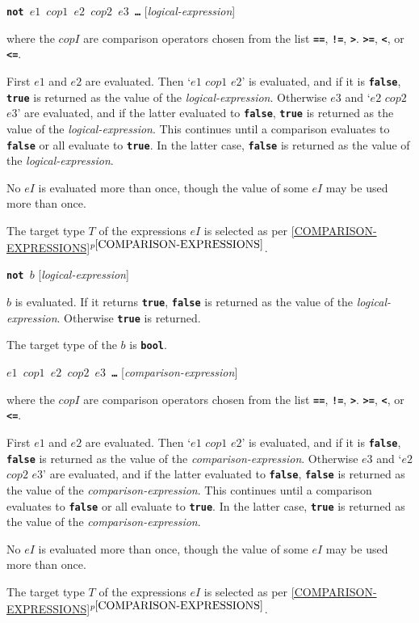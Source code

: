 \documentclass[12pt]{article}
\newcommand{\TT}[1]{{\tt \bfseries #1}}
\newcommand{\itemref}[1]{\ref{#1}$^{p\pageref{#1}}$}
\newenvironment{indpar}[1][0.3in]%
	{\begin{list}{}%
		     {\setlength{\itemsep}{0in}%
		      \setlength{\topsep}{0in}%
		      \setlength{\parsep}{1ex}%
		      \setlength{\labelwidth}{#1}%
		      \setlength{\leftmargin}{#1}%
		      \addtolength{\leftmargin}{\labelsep}}%
	 \item}%
	{\end{list}}
\begin{document}
\TT{not $e1$ $cop1$ $e2$ $cop2$ $e3$ \ldots{}}
\hfill [{\em logical-expression}]
\begin{indpar}
where the $copI$ are comparison operators chosen from the list
\TT{==}, \TT{!=}, \TT{>}. \TT{>=}, \TT{<}, or \TT{<=}.

First $e1$ and $e2$ are evaluated.  Then `$e1$ $cop1$ $e2$'
is evaluated, and if it is \TT{false},
\TT{true} is returned as the value of the {\em logical-expression}.
Otherwise $e3$ and `$e2$ $cop2$ $e3$' are evaluated, and if the latter
evaluated to \TT{false},
\TT{true} is returned as the value of the {\em logical-expression}.
This continues until a comparison evaluates to \TT{false} or all
evaluate to \TT{true}.  In the latter case, \TT{false} is returned as
the value of the {\em logical-expression}.

No $eI$ is evaluated more than once, though the value of some $eI$
may be used more than once.

The target type $T$ of the expressions $eI$ is selected as
per \itemref{COMPARISON-EXPRESSIONS}.
\end{indpar}

\TT{not $b$}
\hfill [{\em logical-expression}]
\begin{indpar}
$b$ is evaluated.  If it returns \TT{true}, \TT{false} is
returned as the value of the {\em logical-expression}.
Otherwise \TT{true} is returned.

The target type of the $b$ is \TT{bool}.
\end{indpar}

\TT{$e1$ $cop1$ $e2$ $cop2$ $e3$ \ldots{}}
\hfill [{\em comparison-expression}]
\begin{indpar}
where the $copI$ are comparison operators chosen from the list
\TT{==}, \TT{!=}, \TT{>}. \TT{>=}, \TT{<}, or \TT{<=}.

First $e1$ and $e2$ are evaluated.  Then `$e1$ $cop1$ $e2$'
is evaluated, and if it is \TT{false},
\TT{false} is returned as the value of the {\em comparison-expression}.
Otherwise $e3$ and `$e2$ $cop2$ $e3$' are evaluated, and if the latter
evaluated to \TT{false},
\TT{false} is returned as the value of the {\em comparison-expression}.
This continues until a comparison evaluates to \TT{false} or all
evaluate to \TT{true}.  In the latter case, \TT{true} is returned as
the value of the {\em comparison-expression}.

No $eI$ is evaluated more than once, though the value of some $eI$
may be used more than once.

The target type $T$ of the expressions $eI$ is selected as
per \itemref{COMPARISON-EXPRESSIONS}.
\end{indpar}
\end{document}
